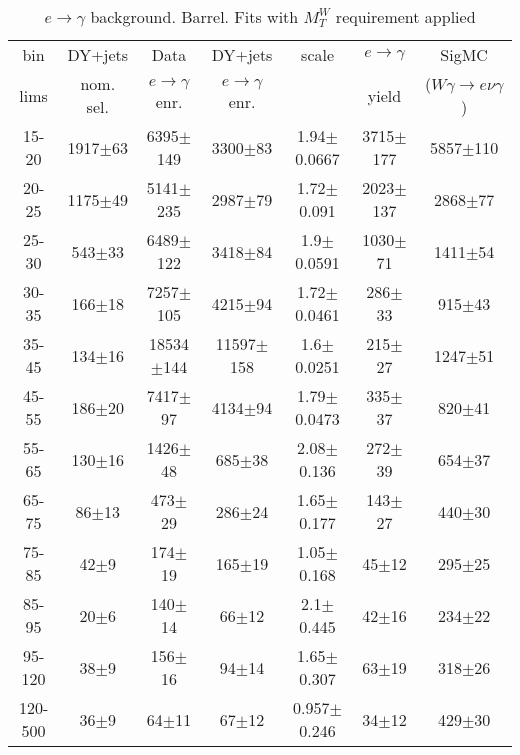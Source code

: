 \begin{table}[h]
  \scriptsize
  \begin{center}
  \caption{$e\rightarrow\gamma$ background. Barrel. Fits with $M_T^W$ requirement applied} 
   \begin{tabular}{|c|c|c|c|c|c|c|}
 bin  & DY+jets    & Data                      & DY+jets & scale & $e\rightarrow\gamma$ & SigMC\\ 
 lims & nom. sel. & $e\rightarrow\gamma$ enr. & $e\rightarrow\gamma$ enr. & & yield & ($W\gamma\rightarrow e\nu\gamma$)\\ \hline
15-20 & 1917$\pm$63 & 6395$\pm$149 & 3300$\pm$83 & 1.94$\pm$0.0667& 3715$\pm$177& 5857$\pm$110 \\ \hline
20-25 & 1175$\pm$49 & 5141$\pm$235 & 2987$\pm$79 & 1.72$\pm$0.091& 2023$\pm$137& 2868$\pm$77 \\ \hline
25-30 & 543$\pm$33 & 6489$\pm$122 & 3418$\pm$84 & 1.9$\pm$0.0591& 1030$\pm$71& 1411$\pm$54 \\ \hline
30-35 & 166$\pm$18 & 7257$\pm$105 & 4215$\pm$94 & 1.72$\pm$0.0461& 286$\pm$33& 915$\pm$43 \\ \hline
35-45 & 134$\pm$16 & 18534$\pm$144 & 11597$\pm$158 & 1.6$\pm$0.0251& 215$\pm$27& 1247$\pm$51 \\ \hline
45-55 & 186$\pm$20 & 7417$\pm$97 & 4134$\pm$94 & 1.79$\pm$0.0473& 335$\pm$37& 820$\pm$41 \\ \hline
55-65 & 130$\pm$16 & 1426$\pm$48 & 685$\pm$38 & 2.08$\pm$0.136& 272$\pm$39& 654$\pm$37 \\ \hline
65-75 & 86$\pm$13 & 473$\pm$29 & 286$\pm$24 & 1.65$\pm$0.177& 143$\pm$27& 440$\pm$30 \\ \hline
75-85 & 42$\pm$9 & 174$\pm$19 & 165$\pm$19 & 1.05$\pm$0.168& 45$\pm$12& 295$\pm$25 \\ \hline
85-95 & 20$\pm$6 & 140$\pm$14 & 66$\pm$12 & 2.1$\pm$0.445& 42$\pm$16& 234$\pm$22 \\ \hline
95-120 & 38$\pm$9 & 156$\pm$16 & 94$\pm$14 & 1.65$\pm$0.307& 63$\pm$19& 318$\pm$26 \\ \hline
120-500 & 36$\pm$9 & 64$\pm$11 & 67$\pm$12 & 0.957$\pm$0.246& 34$\pm$12& 429$\pm$30 \\ \hline
  \end{tabular}
  \label{tab:EtoGAMMA_0}
  \end{center}
\end{table}

